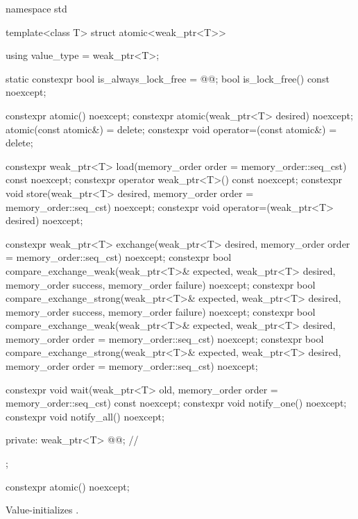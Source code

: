 %
\begin{codeblock}
namespace std {
  template<class T> struct atomic<weak_ptr<T>> {
    using value_type = weak_ptr<T>;

    static constexpr bool is_always_lock_free = @@;
    bool is_lock_free() const noexcept;

    constexpr atomic() noexcept;
    constexpr atomic(weak_ptr<T> desired) noexcept;
    atomic(const atomic&) = delete;
    constexpr void operator=(const atomic&) = delete;

    constexpr weak_ptr<T> load(memory_order order = memory_order::seq_cst) const noexcept;
    constexpr operator weak_ptr<T>() const noexcept;
    constexpr void store(weak_ptr<T> desired,
                         memory_order order = memory_order::seq_cst) noexcept;
    constexpr void operator=(weak_ptr<T> desired) noexcept;

    constexpr weak_ptr<T> exchange(weak_ptr<T> desired,
                                   memory_order order = memory_order::seq_cst) noexcept;
    constexpr bool compare_exchange_weak(weak_ptr<T>& expected, weak_ptr<T> desired,
                                         memory_order success, memory_order failure) noexcept;
    constexpr bool compare_exchange_strong(weak_ptr<T>& expected, weak_ptr<T> desired,
                                           memory_order success, memory_order failure) noexcept;
    constexpr bool compare_exchange_weak(weak_ptr<T>& expected, weak_ptr<T> desired,
                                         memory_order order = memory_order::seq_cst) noexcept;
    constexpr bool compare_exchange_strong(weak_ptr<T>& expected, weak_ptr<T> desired,
                                           memory_order order = memory_order::seq_cst) noexcept;

    constexpr void wait(weak_ptr<T> old,
                        memory_order order = memory_order::seq_cst) const noexcept;
    constexpr void notify_one() noexcept;
    constexpr void notify_all() noexcept;

  private:
    weak_ptr<T> @@;              // \expos
  };
}
\end{codeblock}

%
\begin{itemdecl}
constexpr atomic() noexcept;
\end{itemdecl}

\begin{itemdescr}
\pnum
\effects
Value-initializes .
\end{itemdescr}

